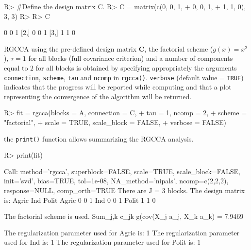 \documentclass[
]{jss}
\begin{document}
\footnotesize

\begin{CodeChunk}
\begin{CodeInput}
R> #Define the design matrix C.
R> C = matrix(c(0, 0, 1,
+              0, 0, 1,
+              1, 1, 0), 3, 3)
R> 
R> C
\end{CodeInput}
\begin{CodeOutput}
     [,1] [,2] [,3]
[1,]    0    0    1
[2,]    0    0    1
[3,]    1    1    0
\end{CodeOutput}
\end{CodeChunk}

\normalsize

RGCCA using the pre-defined design matrix \(\ensuremath{\mathbf{C}}\),
the factorial scheme (\(g(x) = x^2\)), \(\tau = 1\) for all blocks (full
covariance criterion) and a number of components equal to \(2\) for all
blocks is obtained by specifying appropriately the arguments
\texttt{connection}, \texttt{scheme}, \texttt{tau} and \texttt{ncomp} in
\texttt{rgcca()}. \texttt{verbose} (default value = \texttt{TRUE})
indicates that the progress will be reported while computing and that a
plot representing the convergence of the algorithm will be returned.

\footnotesize

\begin{CodeChunk}
\begin{CodeInput}
R> fit = rgcca(blocks = A, connection = C, 
+             tau = 1, ncomp = 2, 
+             scheme = "factorial",  
+             scale = TRUE, scale_block = FALSE,
+             verbose = FALSE)
\end{CodeInput}
\end{CodeChunk}

\normalsize

the \texttt{print()} function allows summarizing the RGCCA analysis.

\footnotesize

\begin{CodeChunk}
\begin{CodeInput}
R> print(fit)
\end{CodeInput}
\begin{CodeOutput}
Call: method='rgcca', superblock=FALSE, scale=TRUE, scale_block=FALSE, init='svd',
bias=TRUE, tol=1e-08, NA_method='nipals', ncomp=c(2,2,2), response=NULL,
comp_orth=TRUE 
There are J = 3 blocks.
The design matrix is:
      Agric Ind Polit
Agric     0   0     1
Ind       0   0     1
Polit     1   1     0

The factorial scheme is used.
Sum_{j,k} c_jk g(cov(X_j a_j, X_k a_k) = 7.9469 

The regularization parameter used for Agric is: 1
The regularization parameter used for Ind is: 1
The regularization parameter used for Polit is: 1
\end{CodeOutput}
\end{CodeChunk}
\end{document}

